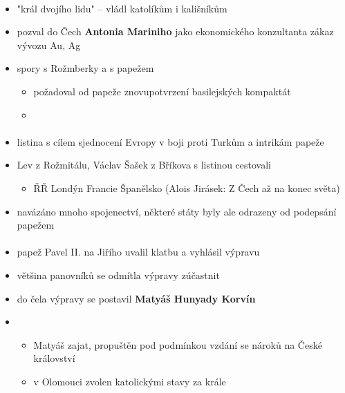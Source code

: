 \paragraph{}
\begin{itemize}
\item "král dvojího lidu" -- vládl katolíkům i kališníkům
\item pozval do Čech \textbf{Antonia Mariniho} jako ekonomického konzultanta \ra zákaz vývozu Au, Ag
\item spory s Rožmberky a s papežem
	\begin{itemize}
	\item požadoval od papeže znovupotvrzení basilejských kompaktát
	\item {}
	\end{itemize}
\end{itemize}

\paragraph{}
\begin{itemize}
\item listina s cílem sjednocení Evropy v boji proti Turkům a intrikám papeže
\item Lev z Rožmitálu, Václav Šašek z Bříkova s listinou cestovali 
	\begin{itemize}
	\item ŘŘ \ra Londýn \ra Francie \ra Španělsko (\ra Alois Jirásek: Z Čech až na konec světa)
	\end{itemize}
\item navázáno mnoho spojenectví, některé státy byly ale odrazeny od podepsání papežem
\end{itemize}

\paragraph{}
\begin{itemize}
\item papež Pavel II. na Jiřího uvalil klatbu a vyhlásil výpravu
\item většina panovníků se odmítla výpravy zúčastnit
\item do čela výpravy se postavil \textbf{Matyáš Hunyady Korvín}
\item {} 
	\begin{itemize}
	\item Matyáš zajat, propuštěn pod podmínkou vzdání se nároků na České království
	\item v Olomouci zvolen katolickými stavy za krále 
	\end{itemize}
\end{itemize}


